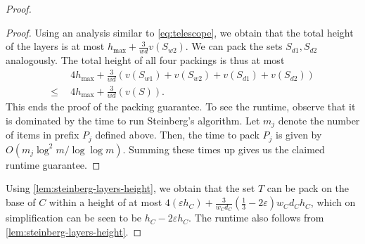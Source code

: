 \documentclass[10pt,a4paper]{amsart}
\newcommand{\kvn}[1]{#1}
\newcommand{\akr}[1]{}
\newcommand{\eps}{\varepsilon}
\renewcommand{\epsilon}{\varepsilon} %
\newtheorem{lemma}[theorem]{Lemma}
\theoremstyle{definition}
\begin{document}
\begin{proof}
\begin{proof}
    Using an analysis similar to \cref{eq:telescope}, we obtain that the total height of the layers is at most $h_{\max}+\frac{3}{wd}v(S_{w2})$. We can pack the sets $S_{d1},S_{d2}$ analogously. The total height of
    all four packings is thus at most
    \begin{align*}
        &4h_{\max}+\frac{3}{wd}(v(S_{w1})+v(S_{w2})+v(S_{d1})+v(S_{d2}))\\
       \le\:\:&4h_{\max}+\frac{3}{wd}(v(S)).
    \end{align*}
    This ends the proof \kvn{of the packing guarantee.
    To see the runtime, observe that it is dominated by the time to run Steinberg's algorithm. Let $m_j$ denote the number of items in prefix $P_j$ defined above. Then,
    the time to pack $P_j$ is given by $O(m_j\log^2 m/\log\log m)$. Summing these times up gives us the claimed runtime guarantee}.
\end{proof}

Using \cref{lem:steinberg-layers-height}, we obtain that the set $T$ can be pack on the base of $C$ within a height of at most $4(\eps h_C)+\frac{3}{w_Cd_C}(\frac13-2\eps)w_Cd_Ch_C$,
which on simplification can be seen to be $h_C-2\eps h_C$. The runtime also follows from \cref{lem:steinberg-layers-height}.
\end{proof}





\end{document}
